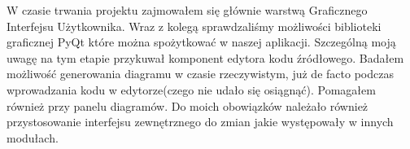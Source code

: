W czasie trwania projektu zajmowałem się głównie warstwą Graficznego Interfejsu Użytkownika. Wraz z kolegą sprawdzaliśmy możliwości biblioteki graficznej PyQt które można spożytkować w naszej aplikacji. Szczególną moją uwagę na tym etapie przykuwał komponent edytora kodu źródłowego. Badałem możliwość generowania diagramu w czasie rzeczywistym, już de facto podczas wprowadzania kodu w edytorze(czego nie udało się osiągnąć). Pomagałem również przy panelu diagramów. Do moich obowiązków należało również przystosowanie interfejsu zewnętrznego do zmian jakie występowały w innych modułach. 